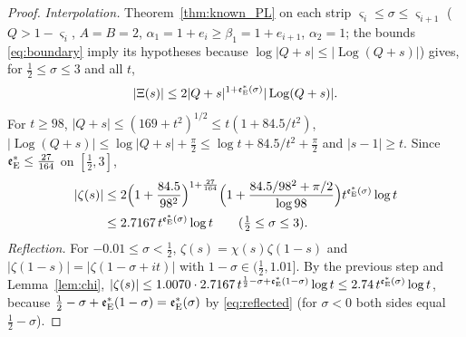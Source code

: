 \documentclass[11pt,a4paper]{article}
\makeatletter
\numberwithin{equation}{section}
\DeclareRobustCommand{\CGref}[1]{\ref{#1}}
\DeclareRobustCommand{\CGeqref}[1]{\eqref{#1}}
\let\CG@origref\ref
\let\CG@origeqref\eqref
\newcommand{\CG@gettip}[1]{\@ifundefined{CGTip@#1}{#1}{\csname CGTip@#1\endcsname}}
\DeclareRobustCommand{\CGref}[1]{\pdftooltip{\CG@origref{#1}}{\CG@gettip{#1}}}
\DeclareRobustCommand{\CGeqref}[1]{\pdftooltip{\CG@origeqref{#1}}{\CG@gettip{#1}}}
\theoremstyle{definition}
\theoremstyle{remark}
\newcommand{\eE}{\mathfrak e_{\rm E}}
\makeatother
\begin{document}
\begin{proof}
\emph{Interpolation.} Theorem~\CGref{thm:known_PL} on each strip $\varsigma_i\le\sigma\le\varsigma_{i+1}$ ($Q>1-\varsigma_i$, $A=B=2$, $\alpha_1=1+e_i\ge\beta_1=1+e_{i+1}$, $\alpha_2=1$; the bounds \CGeqref{eq:boundary} imply its hypotheses because $\log|Q+s|\le|\operatorname{Log}(Q+s)|$) gives, for $\frac12\le\sigma\le3$ and all $t$,
\begin{equation}
|\Xi(s)|\le2|Q+s|^{1+\eE^*(\sigma)}|\operatorname{Log}(Q+s)| .
\label{eq:disp_12}
\end{equation}
For $t\ge98$, $|Q+s|\le(169+t^2)^{1/2}\le t(1+84.5/t^2)$, $|\operatorname{Log}(Q+s)|\le\log|Q+s|+\frac\pi2\le\log t+84.5/t^2+\frac\pi2$ and $|s-1|\ge t$. Since $\eE^*\le\frac{27}{164}$ on $[\frac12,3]$,
\begin{equation}
\begin{split}
|\zeta(s)|&\le2\Bigl(1+\frac{84.5}{98^2}\Bigr)^{1+\frac{27}{164}}\Bigl(1+\frac{84.5/98^2+\pi/2}{\log98}\Bigr)t^{\eE^*(\sigma)}\log t\\
&\le2.7167\,t^{\eE^*(\sigma)}\log t\qquad(\tfrac12\le\sigma\le3).
\end{split}
\label{eq:right_profile}
\end{equation}
\emph{Reflection.} For $-0.01\le\sigma<\frac12$, $\zeta(s)=\chi(s)\zeta(1-s)$ and $|\zeta(1-s)|=|\zeta(1-\sigma+it)|$ with $1-\sigma\in(\frac12,1.01]$. By the previous step and Lemma~\CGref{lem:chi},
$|\zeta(s)|\le1.0070\cdot2.7167\,t^{\frac12-\sigma+\eE^*(1-\sigma)}\log t\le2.74\,t^{\eE^*(\sigma)}\log t$, because $\frac12-\sigma+\eE^*(1-\sigma)=\eE^*(\sigma)$ by \CGeqref{eq:reflected} (for $\sigma<0$ both sides equal $\frac12-\sigma$).
\end{proof}
\end{document}
